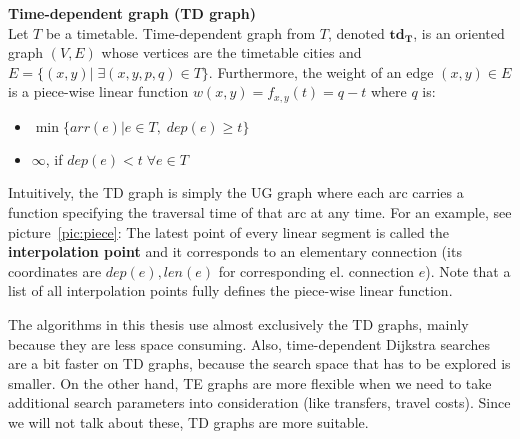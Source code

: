     \begin{definition}
		\textbf{Time-dependent graph (TD graph)}\\
        Let $T$ be a timetable. Time-dependent graph from $T$, denoted $\bm{td_{T}}$, is an oriented graph $(V, E)$ whose vertices are the timetable cities and $E = \{(x, y)| \; \exists (x, y, p, q) \in T\}$. Furthermore, the weight of an edge $(x, y) \in E$ is a piece-wise linear function $w(x, y) = f_{x, y}(t) = q - t$ where $q$ is:
        \begin{itemize}
        	\item $\min \{arr(e) | e \in T, \; dep(e) \geq t\}$
        	\item $\infty$, if $dep(e) < t \; \forall e \in T$
        \end{itemize}
	\end{definition}
	
	\noindent Intuitively, the TD graph is simply the UG graph where each arc carries a function specifying the traversal time of that arc at any time. For an example, see picture~\ref{pic:piece}: The latest point of every linear segment is called the \textbf{interpolation point} and it corresponds to an elementary connection (its coordinates are $dep(e), len(e)$ for corresponding el. connection $e$). Note that a list of all interpolation points fully defines the piece-wise linear function.
	
	The algorithms in this thesis use almost exclusively the TD graphs, mainly because they are less space consuming. Also, time-dependent Dijkstra searches are a bit faster on TD graphs, because the search space that has to be explored is smaller. On the other hand, TE graphs are more flexible when we need to take additional search parameters into consideration (like transfers, travel costs). Since we will not talk about these, TD graphs are more suitable. 
	
	\begin{figure}[htb]
	\centering
	\end{figure}
	
